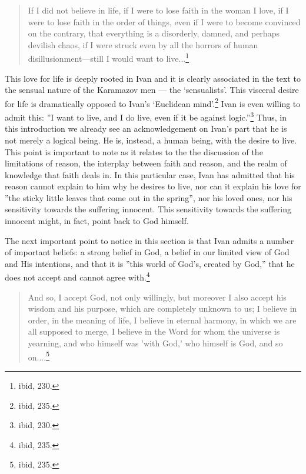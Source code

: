 	\begin{quote}
	If I did not believe in life, if I were to lose faith in the woman I love, if I were to lose faith in the order of things, even if I were to become convinced on the contrary, that everything is a disorderly, damned, and perhaps devilish chaos, if I were struck even by all the horrors of human disillusionment---still I would want to live...\footnote{ibid, 230.} 
	\end{quote}
	
	This love for life is deeply rooted in Ivan and it is clearly associated in the text to the sensual nature of the Karamazov men --- the `sensualists'. This visceral desire for life is dramatically opposed to Ivan's `Euclidean mind'.\footnote{ibid, 235.} Ivan is even willing to admit this: ''I want to live, and I do live, even if it be against logic.''\footnote{ibid, 230.} Thus, in this introduction we already see an acknowledgement on Ivan's part that he is not merely a logical being. He is, instead, a human being, with the desire to live. This point is important to note as it relates to the the discussion of the limitations of reason, the interplay between faith and reason, and the realm of knowledge that faith deals in. In this particular case, Ivan has admitted that his reason cannot explain to him why he desires to live, nor can it explain his love for ''the sticky little leaves that come out in the spring'', nor his loved ones, nor his sensitivity towards the suffering innocent. This sensitivity towards the suffering innocent might, in fact, point back to God himself.

	The next important point to notice in this section is that Ivan admits a number of important beliefs: a strong belief in God, a belief in our limited view of God and His intentions, and that it is ''this world of God's, created by God,'' that he does not accept and cannot agree with.\footnote{ibid, 235.}
 
	\begin{quote}
	And so, I accept God, not only willingly, but moreover I also accept his wisdom and his purpose, which are completely unknown to us; I believe in order, in the meaning of life, I believe in eternal harmony, in which we are all supposed to merge, I believe in the Word for whom the universe is yearning, and who himself was 'with God,' who himself is God, and so on....\footnote{ibid, 235.}
	\end{quote} 

